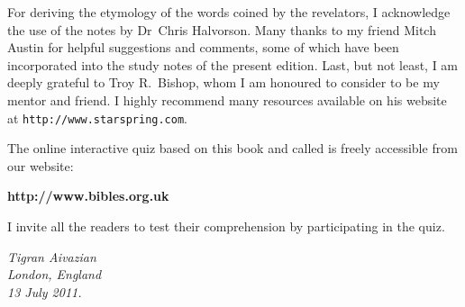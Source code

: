 For deriving the etymology of the words coined by the revelators, I acknowledge the use of the notes by Dr~Chris Halvorson.
Many thanks to my friend Mitch Austin for helpful suggestions and comments, some of which have been incorporated into the study notes of the present edition.
Last, but not least, I am deeply grateful to Troy R.~Bishop, whom I am honoured to consider to be my mentor and friend.
I highly recommend many resources available on his website at \texttt{http://www.starspring.com}.

The online interactive quiz based on this book and called  is freely accessible from our website:

\begin{center}
\upshape\bfseries http://www.bibles.org.uk
\end{center}

I invite all the readers to test their comprehension by participating in the quiz.

\begin{flushleft}
\itshape
\hspace*{6pt}Tigran Aivazian\\
\hspace*{6pt}London, England\\
\hspace*{6pt}13 July 2011.\\
\end{flushleft}

